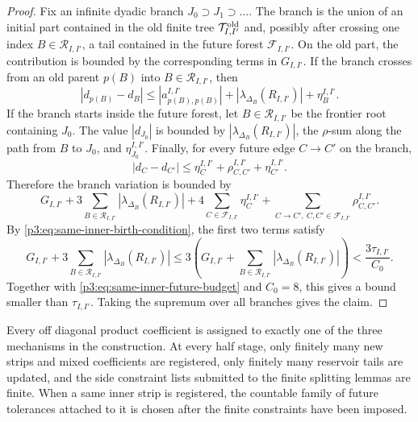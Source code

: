 \documentclass[11pt,reqno]{amsart}
\makeatletter
\theoremstyle{plain}
\theoremstyle{definition}
\newcounter{problempaper}
\newenvironment{problempaperbody}{%
  \setcounter{subsection}{0}%
  \setcounter{subsubsection}{0}%
  \setcounter{paragraph}{0}%
  \renewcommand{\thesubsection}{\arabic{subsection}}%
  \renewcommand{\thesubsubsection}{\thesubsection.\arabic{subsubsection}}%
  \renewcommand{\theparagraph}{\thesubsubsection.\arabic{paragraph}}%
  \let\problem@outersection\section
  \let\problem@outersubsection\subsection
  \let\problem@outersubsubsection\subsubsection
  \let\problem@outerparagraph\paragraph
  \let\section\problem@papersection
  \let\subsection\problem@papersubsection
  \let\subsubsection\problem@papersubsubsection
}{%
  \let\section\problem@outersection
  \let\subsection\problem@outersubsection
  \let\subsubsection\problem@outersubsubsection
  \let\paragraph\problem@outerparagraph
}
\newcommand{\problem@target}[2]{%
  \hypertarget{problem-\theproblempaper-#1-#2}{}%
}
\newcommand{\problem@paperheading}[3]{%
  \par\bigskip
  \problem@target{#1}{#2}%
  \noindent{\large\bfseries #2.\quad #3\par}%
  \nobreak\smallskip
}
\newcommand{\problem@papersubheading}[3]{%
  \par\medskip
  \problem@target{#1}{#2}%
  \noindent{\normalsize\bfseries #2.\quad #3\par}%
  \nobreak\smallskip
}
\newcommand{\problem@papersubsubheading}[3]{%
  \par\smallskip
  \problem@target{#1}{#2}%
  \noindent{\normalsize\itshape #2.\quad #3.\ }%
}
\def\problem@papersection{%
  \@ifstar{\problem@papersectionstar}{\problem@papersectionnostar}%
}
\def\problem@papersectionstar#1{%
  \par\bigskip\noindent{\large\bfseries #1\par}\nobreak\smallskip
}
\def\problem@papersectionnostar#1{%
  \refstepcounter{subsection}%
  \setcounter{subsubsection}{0}%
  \setcounter{paragraph}{0}%
  \problem@paperheading{section}{\thesubsection}{#1}%
  \problem@writecontentsline{section}{\thesubsection}{#1}%
}
\def\problem@papersubsection{%
  \@ifstar{\problem@papersubsectionstar}{\problem@papersubsectionnostar}%
}
\def\problem@papersubsectionstar#1{%
  \par\medskip\noindent{\normalsize\bfseries #1\par}\nobreak\smallskip
}
\def\problem@papersubsectionnostar#1{%
  \refstepcounter{subsubsection}%
  \setcounter{paragraph}{0}%
  \problem@papersubheading{subsection}{\thesubsubsection}{#1}%
  \problem@writecontentsline{subsection}{\thesubsubsection}{#1}%
}
\def\problem@papersubsubsection{%
  \@ifstar{\problem@papersubsubsectionstar}{\problem@papersubsubsectionnostar}%
}
\def\problem@papersubsubsectionstar#1{%
  \par\smallskip\noindent{\normalsize\itshape #1.\ }%
}
\def\problem@papersubsubsectionnostar#1{%
  \refstepcounter{paragraph}%
  \problem@papersubsubheading{subsubsection}{\theparagraph}{#1}%
  \problem@writecontentsline{subsubsection}{\theparagraph}{#1}%
}
\newcommand{\problem@writecontentsline}[3]{%
  \begingroup
  \protected@write\@auxout{}{%
    \string\problemcontentsentry{\theproblempaper}{#1}{#2}{#3}{\thepage}%
  }%
  \endgroup
}
\newcommand{\problemcontentsentry}[5]{%
  \@ifundefined{problemcontents@#1}{%
    \expandafter\gdef\csname problemcontents@#1\endcsname{}%
  }{}%
  \expandafter\g@addto@macro\csname problemcontents@#1\endcsname{%
    \problemcontentsline{#1}{#2}{#3}{#4}{#5}%
  }%
}
\newcommand{\problemcontentslink}[4]{%
  \hyperlink{problem-#1-#2-#3}{#4}%
}
\newcommand{\problemcontentsline}[5]{%
  \ifstrequal{#2}{section}{%
    \par\noindent
    \problemcontentslink{#1}{#2}{#3}{\makebox[2.5em][l]{#3}#4}%
    \nobreak\dotfill
    \problemcontentslink{#1}{#2}{#3}{#5}\par
  }{%
    \ifstrequal{#2}{subsection}{%
      \par\noindent\hspace*{1.5em}%
      \problemcontentslink{#1}{#2}{#3}{\makebox[3.5em][l]{#3}#4}%
      \nobreak\dotfill
      \problemcontentslink{#1}{#2}{#3}{#5}\par
    }{%
      \par\noindent\hspace*{3em}%
      \problemcontentslink{#1}{#2}{#3}{\makebox[4.5em][l]{#3}#4}%
      \nobreak\dotfill
      \problemcontentslink{#1}{#2}{#3}{#5}\par
    }%
  }%
}
\makeatother
\begin{document}
\begin{problempaperbody}
\begin{proof}
Fix an infinite dyadic branch $J_0\supset J_1\supset\ldots$. The branch is the union of an initial part contained in the old finite tree $\mathcal T_{I,I'}^{\rm old}$ and, possibly after crossing one index $B\in\mathcal R_{I,I'}$, a tail contained in the future forest $\mathcal F_{I,I'}$. On the old part, the contribution is bounded by the corresponding terms in $G_{I,I'}$. If the branch crosses from an old parent $p(B)$ into $B\in\mathcal R_{I,I'}$, then
\begin{equation*}
        |d_{p(B)}-d_B|\leq |a_{p(B), p(B)}^{I,I'}|+|\lambda_{\Delta_B}(R_{I,I'})|+\eta_B^{I,I'}.
\end{equation*}
If the branch starts inside the future forest, let $B\in\mathcal R_{I,I'}$ be the frontier root containing $J_0$. The value $|d_{J_0}|$ is bounded by $|\lambda_{\Delta_B}(R_{I,I'})|$, the $\rho$-sum along the path from $B$ to $J_0$, and $\eta_{J_0}^{I,I'}$. Finally, for every future edge $C\to C'$ on the branch,
\begin{equation*}
        |d_C-d_{C'}|\leq \eta_C^{I,I'}+\rho_{C,C'}^{I,I'}+\eta_{C'}^{I,I'}.
\end{equation*}
Therefore the branch variation is bounded by
\begin{equation*}
        G_{I,I'}+3\sum_{B\in\mathcal R_{I,I'}}|\lambda_{\Delta_B}(R_{I,I'})|+4\sum_{C\in\mathcal F_{I,I'}}\eta_C^{I,I'}+\sum_{C\to C',\ C,C'\in\mathcal F_{I,I'}}\rho_{C,C'}^{I,I'}.
\end{equation*}
By \eqref{p3:eq:same-inner-birth-condition}, the first two terms satisfy
\begin{equation*}
        G_{I,I'}+3\sum_{B\in\mathcal R_{I,I'}}|\lambda_{\Delta_B}(R_{I,I'})|\leq 3\left(G_{I,I'}+\sum_{B\in\mathcal R_{I,I'}}|\lambda_{\Delta_B}(R_{I,I'})|\right)<\frac{3\tau_{I,I'}}{C_0}.
\end{equation*}
Together with \eqref{p3:eq:same-inner-future-budget} and $C_0=8$, this gives a bound smaller than $\tau_{I,I'}$. Taking the supremum over all branches gives the claim.
\end{proof}

\begin{p3claim}
\label{p3:claim:registration-finiteness}
Every off diagonal product coefficient is assigned to exactly one of the three mechanisms in the construction. At every half stage, only finitely many new strips and mixed coefficients are registered, only finitely many reservoir tails are updated, and the side constraint lists submitted to the finite splitting lemmas are finite. When a same inner strip is registered, the countable family of future tolerances attached to it is chosen after the finite constraints have been imposed.
\end{p3claim}


\end{problempaperbody}
\end{document}
